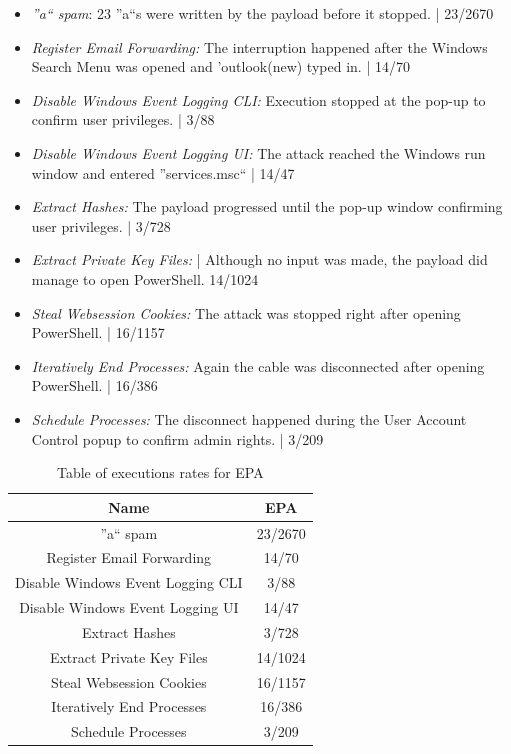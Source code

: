 \begin{itemize}
    \item  \emph{''a`` spam}: 23 ''a``s were written by the payload before it stopped. | 23/2670
    \item  \emph{Register Email Forwarding:} The interruption happened after the Windows Search Menu was opened and 'outlook(new) typed in.  |  14/70 
    \item  \emph{Disable Windows Event Logging CLI:}  Execution stopped at the pop-up to confirm user privileges. | 3/88
    \item  \emph{Disable Windows Event Logging UI:} The attack reached the Windows run window and entered ''services.msc`` | 14/47
    \item  \emph{Extract Hashes:}  The payload progressed until the pop-up window confirming user privileges. | 3/728 
    \item  \emph{Extract Private Key Files:}  | Although no input was made, the payload did manage to open PowerShell. 14/1024
    \item  \emph{Steal Websession Cookies:} The attack was stopped right after opening PowerShell. | 16/1157
    \item  \emph{Iteratively End Processes:} Again the cable was disconnected after opening PowerShell. | 16/386
    \item  \emph{Schedule Processes:} The disconnect happened during the User Account Control popup to confirm admin rights. | 3/209
\end{itemize}

\begin{table}[h]
\centering
\begin{tabular}{|c|c|}
\hline
Name & EPA  \\
\hline
''a`` spam & 23/2670 \\
\hline
Register Email Forwarding & 14/70 \\
\hline
Disable Windows Event Logging CLI & 3/88 \\
\hline
Disable Windows Event Logging UI & 14/47 \\
\hline
Extract Hashes & 3/728  \\
\hline
Extract Private Key Files & 14/1024 \\
\hline
Steal Websession Cookies & 16/1157 \\
\hline
Iteratively End Processes & 16/386 \\
\hline
Schedule Processes & 3/209 \\
\hline
\end{tabular}
\caption{Table of executions rates for EPA}
\label{table:EPA_results}
\end{table}

